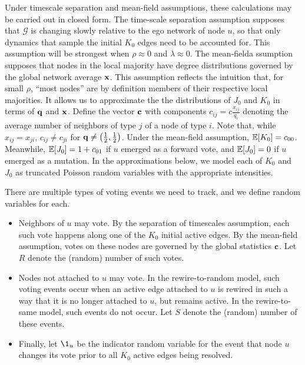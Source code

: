 \documentclass[review, onefignum, onetabnum]{siamart171218}
\begin{document}
		Under timescale separation and mean-field   assumptions, these calculations may be carried out in closed form. 
		The time-scale separation assumption supposes that $\mathcal{G}$ is changing slowly relative to the ego network of node $u$, so that only dynamics that sample the initial $K_0$ edges need to be accounted for. 
		This assumption will be strongest when $\rho \approx 0$ and $\lambda \approx 0$. 
		The mean-fielda ssumption supposes that nodes in the local majority have degree distributions governed by the global network average $\mathbf{x}$. 
		This assumption reflects the intuition that, for small $\rho$, ``most nodes'' are by definition members of their respective local majorities. 
		It allows us to approximate the the distributions of $J_0$ and $K_0$ in terms of $\mathbf{q}$ and $\mathbf{x}$. 
		Define the vector $\mathbf{c}$ with components $c_{ij} = c\frac{x_{ij}}{q_i}$ denoting the average number of neighbors of type $j$ of a node of type $i$. 
		Note that, while $x_{ij} = x_{ji}$, $c_{ij} \neq c_{ji}$ for $\mathbf{q} \neq \left(\frac{1}{2}, \frac{1}{2}\right)$.
		Under the mean-field assumption, $\mathbb{E}[K_0] = c_{00}$. 
		Meanwhile, $\mathbb{E}[J_0] = 1 + c_{01}$ if $u$ emerged as a forward vote, and $\mathbb{E}[J_0] = 0$ if $u$ emerged as a mutation. 
		In the approximations below, we model each of $K_0$ and $J_0$ as truncated Poisson random variables with the appropriate intensities. 

		There are multiple types of voting events we need to track, and we define random variables for each. 
		\begin{itemize}
			\item Neighbors of $u$ may vote. By the separation of timescales assumption, each such vote happens along one of the $K_0$ initial active edges. By the mean-field assumption, votes on these nodes are governed by the global statistics $\mathbf{c}$. Let $R$ denote the (random) number of such votes. 
			\item Nodes not attached to $u$ may vote. In the rewire-to-random model, such voting events occur when an active edge attached to $u$ is rewired in such a way that it is no longer attached to $u$, but remains active. In the rewire-to-same model, such events do not occur. Let $S$ denote the (random) number of these events. 
			\item Finally, let $\1_u$ be the indicator random variable for the event that node $u$ changes its vote prior to all $K_0$ active edges being resolved. 
		\end{itemize}
		
\end{document}
